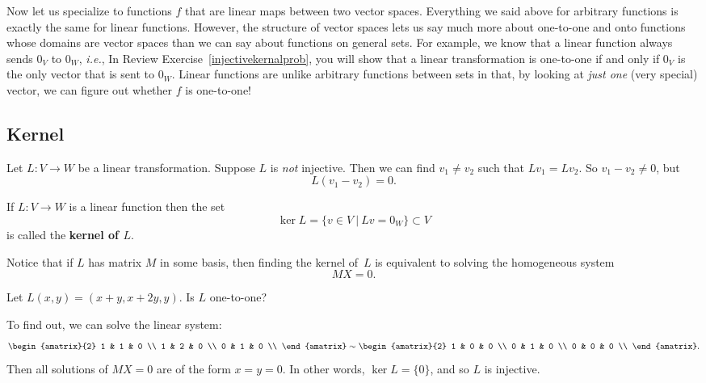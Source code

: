 Now let us specialize to functions \(f\) that are linear maps between two vector spaces. Everything we said above for arbitrary functions is exactly the same for linear functions. However, the structure of vector spaces lets us say much more about one-to-one and onto functions whose domains are vector spaces than we can say about functions on general sets.  For example, we know that a linear function always sends $0_V$ to $0_W$, {\itshape i.e.},
In Review Exercise~\ref{injectivekernalprob}, you will show that a linear transformation is one-to-one if and only if $0_V$ is the only vector that is sent to $0_W$. Linear functions are unlike  arbitrary functions between sets in that, by looking at {\itshape just one} (very special) vector, we can figure out whether $f$ is one-to-one!  
\subsection{Kernel}
Let \(L \colon V \to W\) be a linear transformation. Suppose \(L\) is \emph{not} injective.  Then we can find $v_1 \neq v_2$ such that $Lv_1=Lv_2$.  So $v_1-v_2\neq 0$, but
\[
L(v_1-v_2)=0.
\]

\begin{definition}
If $L \colon V\rightarrow W$ is a linear function  then the set 
\[
\ker L = \{v\in V ~|~ Lv=0_W \}\subset V 
\]
is called the {\bf kernel of $L$}.
\end{definition}


Notice that if $L$ has matrix $M$ in some basis, then finding the kernel of~$L$ is equivalent to solving the homogeneous system 
\[
MX=0.
\]

\begin{example}
Let $L(x,y)=(x+y,x+2y,y)$.  Is $L$ one-to-one?

To find out, we can solve the linear system:
\[
\begin{amatrix}{2}
1 & 1 & 0 \\
1 & 2 & 0 \\
0 & 1 & 0 \\
\end{amatrix} \sim
\begin{amatrix}{2}
1 & 0 & 0 \\
0 & 1 & 0 \\
0 & 0 & 0 \\
\end{amatrix}.
\]
Then all solutions of $MX=0$ are of the form $x=y=0$.  In other words, $\ker L=\{0\}$, and so $L$ is injective.
\end{example}

